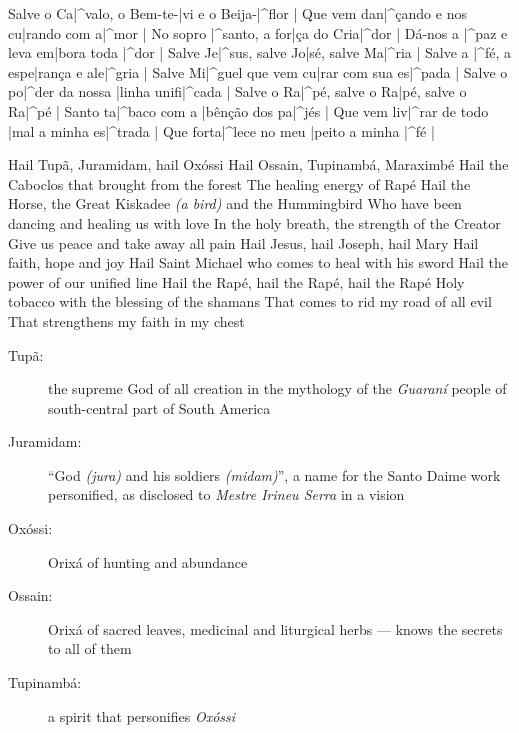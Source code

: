 \beginverse{}
    Salve o Ca|^valo, o Bem-te-|vi e o Beija-|^flor | \e
    Que vem dan|^çando e nos cu|rando com a|^mor | \e
  \endverse\glueverses
  \beginchorus{}
    No sopro |^santo, a for|ça do Cria|^dor | \e
    Dá-nos a |^paz e leva em|bora toda |^dor | \e
  \endchorus
  \beginverse{}
    Salve Je|^sus, salve Jo|sé, salve Ma|^ria | \e
    Salve a |^fé, a espe|rança e ale|^gria | \e
  \endverse\glueverses
  \beginchorus{}
    Salve Mi|^guel que vem cu|rar com sua es|^pada | \e
    Salve o po|^der da nossa |linha unifi|^cada | \e
  \endchorus
  \beginverse{}
    Salve o Ra|^pé, salve o Ra|pé, salve o Ra|^pé | \e
    Santo ta|^baco com a |bênção dos pa|^jés | \e
  \endverse\glueverses
  \beginchorus{}
    Que vem liv|^rar de todo |mal a minha es|^trada | \e
    Que forta|^lece no meu |peito a minha |^fé | \e
  \endchorus
  \begin{translation}
    Hail Tupã, Juramidam, hail Oxóssi
    Hail Ossain, Tupinambá, Maraximbé
    Hail the Caboclos that brought from the forest
    The healing energy of Rapé
    \nextverse
    Hail the Horse, the Great Kiskadee \emph{(a bird)} and the Hummingbird
    Who have been dancing and healing us with love
    In the holy breath, the strength of the Creator
    Give us peace and take away all pain
    \nextverse
    Hail Jesus, hail Joseph, hail Mary
    Hail faith, hope and joy
    Hail Saint Michael who comes to heal with his sword
    Hail the power of our unified line
    \nextverse
    Hail the Rapé, hail the Rapé, hail the Rapé
    Holy tobacco with the blessing of the shamans
    That comes to rid my road of all evil
    That strengthens my faith in my chest
  \end{translation}
  \begin{explanation}
    \begin{description}
      \item[Tupã:] the supreme God of all creation in the mythology of the
        \emph{Guaraní} people of south-central part of South America
      \item[Juramidam:] ``God \emph{(jura)} and his soldiers \emph{(midam)}'',
        a name for the Santo Daime work personified, as disclosed to
        \emph{Mestre Irineu Serra} in a vision
      \item[Oxóssi:] Orixá of hunting and abundance
      \item[Ossain:] Orixá of sacred leaves, medicinal and liturgical herbs ---
        knows the secrets to all of them
      \item[Tupinambá:] a spirit that personifies \emph{Oxóssi}
    \end{description}
  \end{explanation}
\endsong


